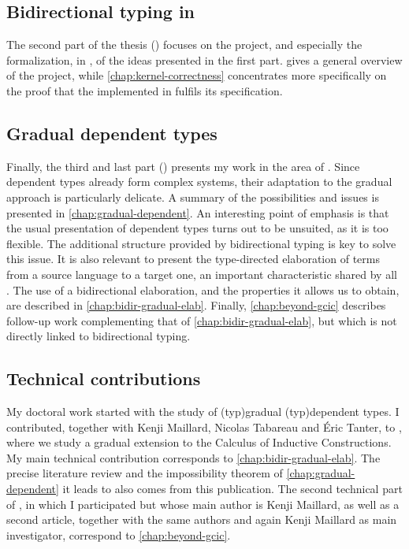 \subsection{Bidirectional typing in }

The second part of the thesis () focuses on the  project,
and especially the formalization, in , of the ideas presented in the first part.
 gives a general overview of the project, while
\cref{chap:kernel-correctness} concentrates more specifically on the proof that the
 implemented in  fulfils its specification.

\subsection{Gradual dependent types}

Finally, the third and last part () presents my work in the area
of . Since dependent types already form complex systems, their adaptation
to the gradual approach is particularly delicate. A summary of the possibilities and issues is
presented in \cref{chap:gradual-dependent}. An interesting point of emphasis is that the
usual presentation of dependent types turns out to be unsuited, as it is too flexible.
The additional structure provided by bidirectional typing is key to solve this issue. It is also
relevant to present the type-directed elaboration of terms from a source language
to a target one, an important characteristic shared by all .
The use of a bidirectional elaboration, and the properties it allows us to obtain, are described
in \cref{chap:bidir-gradual-elab}. Finally, \cref{chap:beyond-gcic} describes follow-up work
complementing that of \cref{chap:bidir-gradual-elab}, but which is not directly linked to
bidirectional typing.

\subsection{Technical contributions}

My doctoral work started with the study of \kl(typ){gradual}
\kl(typ){dependent} types.
I contributed, together with Kenji Maillard, Nicolas Tabareau and Éric Tanter, to
, where we study a gradual extension to the
Calculus of Inductive Constructions. My main technical contribution corresponds
to \cref{chap:bidir-gradual-elab}. The precise literature review and the impossibility
theorem of \cref{chap:gradual-dependent} it leads to also comes from this
publication.
The second technical part of \textcite{LennonBertrand2022}, in which I participated but
whose main author is Kenji Maillard, as well as a second article,%
%
together with the same authors and again Kenji Maillard as main investigator,
correspond to \cref{chap:beyond-gcic}.

